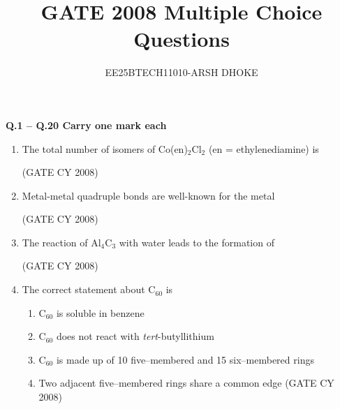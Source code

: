 \documentclass[12pt]{article}
\author{EE25BTECH11010-ARSH DHOKE}
\title{GATE 2008 Multiple Choice Questions}
\date{}
\begin{document}
\maketitle

\textbf{Q.1 -- Q.20 Carry one mark each}

\begin{enumerate}
   \item The total number of isomers of Co(en)$_2$Cl$_2$ (en = ethylenediamine) is
   \begin{enumerate}
    \hfill (GATE CY 2008)
   \end{enumerate}
   

   
    \item   Metal-metal quadruple bonds are well-known for the metal
\begin{enumerate}
\hfill{(GATE CY 2008)}
\end{enumerate}

    \item The reaction of Al$_4$C$_3$ with water leads to the formation of
   \begin{enumerate}
    \end{enumerate}
\hfill{(GATE CY 2008)}

 \item The correct statement about C$_{60}$ is
\begin{enumerate}
        \item  C$_{60}$ is soluble in benzene \\
        \item  C$_{60}$ does not react with \textit{tert}-butyllithium \\
        \item  C$_{60}$ is made up of 10 five–membered and 15 six–membered rings \\
        \item  Two adjacent five–membered rings share a common edge
    \hfill (GATE CY 2008)
    \end{enumerate}


\end{enumerate}
\end{document}
